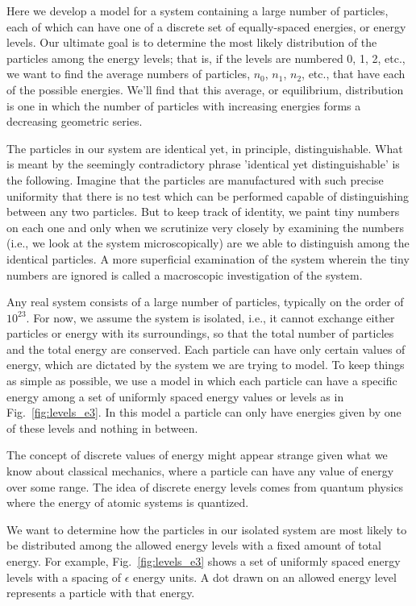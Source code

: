 Here we develop a model for a system containing a large number of
particles, each of which can have one of a discrete set of
equally-spaced energies, or energy levels.  Our ultimate goal is to
determine the most likely distribution of the particles among the
energy levels; that is, if the levels are numbered 0, 1, 2, etc., we
want to find the average numbers of particles, $n_0$, $n_1$, $n_2$,
etc., that have each of the possible energies.  We'll find that this
average, or equilibrium, distribution is one in which the number of
particles with increasing energies forms a decreasing geometric
series.
    
The particles in our system are identical yet, in principle,
distinguishable.  What is meant by the seemingly contradictory phrase
'identical yet distinguishable' is the following.  Imagine that the
particles are manufactured with such precise uniformity that there is
no test which can be performed capable of distinguishing between any
two particles.  But to keep track of identity, we paint tiny numbers
on each one and only when we scrutinize very closely by examining the
numbers (i.e., we look at the system microscopically) are we able to
distinguish among the identical particles.  A more superficial
examination of the system wherein the tiny numbers are ignored is
called a macroscopic investigation of the system.
    
Any real system consists of a large number of particles, typically on
the order of $10^{23}$.  For now, we assume the system is isolated,
i.e., it cannot exchange either particles or energy with its
surroundings, so that the total number of particles and the total
energy are conserved.  Each particle can have only certain values of
energy, which are dictated by the system we are trying to model.  To
keep things as simple as possible, we use a model in which each
particle can have a specific energy among a set of uniformly spaced
energy values or levels as in Fig.~\ref{fig:levels_e3}.  In this model
a particle can only have energies given by one of these levels and
nothing in between.
    
The concept of discrete values of energy might appear strange given
what we know about classical mechanics, where a particle can have any
value of energy over some range.  The idea of discrete energy levels
comes from quantum physics where the energy of atomic systems is
quantized.
    
We want to determine how the particles in our isolated system are most
likely to be distributed among the allowed energy levels with a fixed
amount of total energy.  For example, Fig.~\ref{fig:levels_e3} shows a
set of uniformly spaced energy levels with a spacing of $\epsilon$
energy units.  A dot drawn on an allowed energy level represents a
particle with that energy.
          
